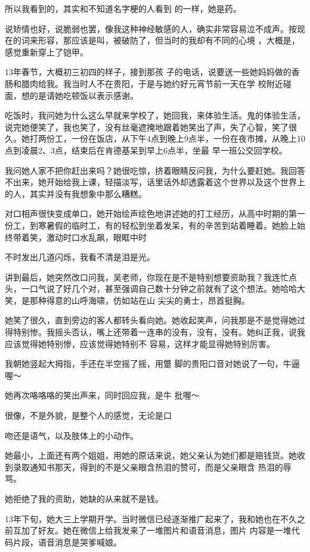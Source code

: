 \documentclass{article}
\begin{document}
所以我看到的，其实和不知道名字梗的人看到
的一样，她是药。 

说矫情也好，说脆弱也罢，像我这种神经敏感的人，确实非常容易泣不成声。按现在的词来形容，那应该是叫，被破防了，但当时的我却有不同的心境
，大概是，感觉重新穿上了铠甲。 


13年春节，大概初三初四的样子，接到那孩
\newpage
子的电话，说要送一些她妈妈做的香肠和腊肉给我。我当时人不在贵阳，于是与她约好元宵节前一天在学
校附近碰面，想的是请她吃顿饭以表示感谢。 

吃饭时，我问她为什么这么早就来学校了，她回我，来体验生活。鬼的体验生活，说完她便笑了，我也笑了，没有丝毫遮掩地跟着她笑出了声，失了心智，笑了很久。她打两份工，一份在饭店，从下午4点到晚上9点半，一份在夜市摊，从晚上10点到凌晨2、3点，结束后在肯德基呆到早上6点半，坐最
早一班公交回学校。 

我问她人家不把你赶出来吗？她很吃惊，挤着眼睛反问我，为什么要赶她。我回答不出来，她开始给我上课，轻描淡写，话里话外却透露着这个世界以及这个世界上的人，其实并没有我想象中那么糟糕。

对口相声很快变成单口，她开始绘声绘色地讲述她的打工经历，从高中时期的第一份工，到寒暑假的临时工，有的轻松到坐着发呆，有的辛苦到站着睡着。她脸上始终带着笑，激动时口水乱飙，眼眶中时
\newpage

不时发出几道闪烁，我看不清是泪是光。 

讲到最后，她突然改口问我，吴老师，你现在是不是特别想要资助我？我连忙点头，一口气说了好几个对，甚至强调自己数十分钟之前就有了这个想法。她哈哈大笑，是那种得意的山呼海啸，仿如站在山
尖尖的勇士，昂首挺胸。 

她笑了很久，直到旁边的客人都转头看向她。她收起笑声，问我那是不是觉得她过得特别惨。我摇头否认，嘴上还带着一连串的没有，没有，没有。她纠正我，说我应该觉得她特别惨，应该觉得她特别不
容易，这样才能显得她特别厉害。 

我朝她竖起大拇指，手还在半空摇了摇，用蹩
脚的贵阳口音对她说了一句，牛逼喔～ 

她再次咯咯咯的笑出声来，同时回应我，是牛
批喔～ 

很像，不是外貌，是整个人的感觉，无论是口
\newpage

吻还是语气，以及肢体上的小动作。 

她最小，上面还有两个姐姐，用她的原话来说，她父亲认为她们都是赔钱货。她收到录取通知书那天，得到的不是父亲眼含热泪的赞可，而是父亲眼含
热泪的辱骂。 


她拒绝了我的资助，她缺的从来就不是钱。 


13年下旬，她大三上学期开学。当时微信已经逐渐推广起来了，我和她也在不久之前互加了好友。她在微信上给我发来了一堆图片和语音消息，图片
内容是一堆代码片段，语音消息是哭爹喊娘。 
\end{document}
